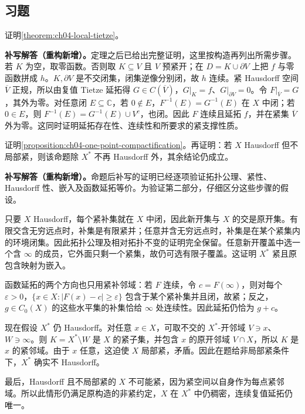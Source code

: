 \documentclass[../../main.tex]{subfiles}%
\begin{document}
\subsection*{习题}
\begin{exercise}\label{exercise:ch04-prove-local-tietze}
证明\cref{theorem:ch04-local-tietze}。
\end{exercise}
\begin{solution}
\textbf{补写解答（重构新增）。}定理之后已给出完整证明，这里按构造再列出所需步骤。若 $K$ 为空，取零函数。否则取 $K\subseteq V$ 且 $V$ 预紧开；在 $D=K\cup\partial V$ 上把 $f$ 与零函数拼成 $h$。$K,\partial V$ 是不交闭集，闭集逆像分别闭，故 $h$ 连续。紧 Hausdorff 空间 $\overline V$ 正规，所以由复值 Tietze 延拓得 $G\in C(\overline V)$，$G|_K=f$、$G|_{\partial V}=0$。令 $F|_{\overline V}=G$，其外为零。对任意闭 $E\subseteq\mathbb C$，若 $0\notin E$，$F^{-1}(E)=G^{-1}(E)$ 在 $X$ 中闭；若 $0\in E$，则 $F^{-1}(E)=G^{-1}(E)\cup V^c$，也闭。因此 $F$ 连续且延拓 $f$，并在紧集 $\overline V$ 外为零。这同时证明延拓存在性、连续性和所要求的紧支撑性质。
\end{solution}
\begin{exercise}\label{exercise:ch04-prove-one-point}
证明\cref{proposition:ch04-one-point-compactification}。再证明：若 $X$ Hausdorff 但不局部紧，则该命题除 $X^*$ 不再 Hausdorff 外，其余结论仍成立。
\end{exercise}
\begin{solution}
\textbf{补写解答（重构新增）。}命题后补写的证明已经逐项验证拓扑公理、紧性、Hausdorff 性、嵌入及函数延拓等价。为验证第二部分，仔细区分这些步骤的假设。

只要 $X$ Hausdorff，每个紧补集就在 $X$ 中闭，因此新开集与 $X$ 的交是原开集。有限交含无穷远点时，补集是有限紧并；任意并含无穷远点时，补集是在某个紧集内的环境闭集。因此拓扑公理及相对拓扑不变的证明完全保留。任意新开覆盖中选一个含 $\infty$ 的成员，它外面只剩一个紧集，故仍可选有限子覆盖。这证明 $X^*$ 紧且原包含映射为嵌入。

函数延拓的两个方向也只用紧补邻域：若 $F$ 连续，令 $c=F(\infty)$，则对每个 $\varepsilon>0$，$\{x\in X:|F(x)-c|\ge\varepsilon\}$ 包含于某个紧补集并且闭，故紧；反之，$g\in C_0(X)$ 的这些水平集的补集恰给 $\infty$ 处连续性。因此延拓仍恰为 $g+c$。

现在假设 $X^*$ 仍 Hausdorff。对任意 $x\in X$，可取不交的 $X^*$-开邻域 $V\ni x$、$W\ni\infty$。则 $K=X^*\setminus W$ 是 $X$ 的紧子集，并包含 $x$ 的原开邻域 $V\cap X$，所以 $K$ 是 $x$ 的紧邻域。由于 $x$ 任意，这迫使 $X$ 局部紧，矛盾。因此在题给非局部紧条件下，$X^*$ 确实不 Hausdorff。

最后，Hausdorff 且不局部紧的 $X$ 不可能紧，因为紧空间以自身作为每点紧邻域。所以此情形仍满足原构造的非紧约定，$X$ 在 $X^*$ 中仍稠密，连续复值延拓仍唯一。
\end{solution}
\end{document}

